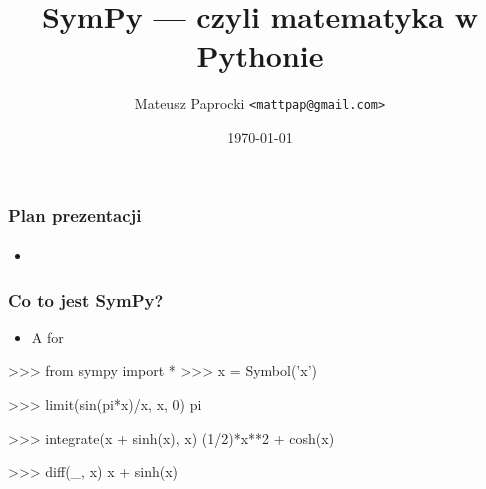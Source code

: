 \documentclass[10pt,polish]{beamer}
\title{SymPy --- czyli matematyka w Pythonie}
\author{Mateusz Paprocki \texttt{<mattpap@gmail.com>}}
\institute{Wrocław University of Technology \\ University of Nevada, Reno}
\date{\today}
\begin{document}
\begin{frame}[plain,t]
    \maketitle
\end{frame}

\begin{frame}
    \frametitle{Plan prezentacji}
    \framesubtitle{}

    \begin{itemize}
        \item
    \end{itemize}
\end{frame}

\begin{frame}[fragile]
    \frametitle{Co to jest SymPy?}

    \begin{itemize}
        \item A  for 
    \end{itemize}
    \pause
    \begin{python}
>>> from sympy import *
>>> x = Symbol('x')

>>> limit(sin(pi*x)/x, x, 0)
pi

>>> integrate(x + sinh(x), x)
(1/2)*x**2 + cosh(x)

>>> diff(_, x)
x + sinh(x)
    \end{python}
\end{frame}
\end{document}
